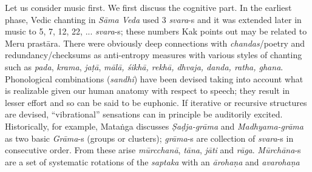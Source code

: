 Let us consider music first. We first discuss the cognitive part. In the earliest phase, Vedic chanting in \textsl{Sāma Veda} used 3 \textsl{svara}-s and it was extended later in music to 5, 7, 12, 22, ... \textsl{svara}-s; these numbers Kak points out may be related to Meru prastāra. There were obviously deep connections with \textsl{chandas}/poetry and redundancy/checksums as anti-entropy measures with various styles of chanting such as \textsl{pada}, \textsl{krama}, \textsl{jaṭā}, \textsl{mālā, śikhā, rekhā, dhvaja, danda, ratha, ghana}. Phonological combinations (\textsl{sandhi}) have been devised taking into account what is realizable given our human anatomy with respect to speech; they result in lesser effort and so can be said to be euphonic. If iterative or recursive structures are devised, “vibrational” sensations can in principle be auditorily excited. Historically, for example, Mataṅga discusses \textsl{Ṣaḍja-grāma} and \textsl{Madhyama-grāma} as two basic \textsl{Grāma}-s (groups or clusters); \textsl{grāma}-s are collection of \textsl{svara}-s in consecutive order. From these arise \textsl{mūrcchanā}, \textsl{tāna}, \textsl{jāti} and \textsl{rāga}. \textsl{Mūrchāna}-s are a set of systematic rotations of the \textsl{saptaka} with an \textsl{ārohaṇa} and \textsl{avarohaṇa}
